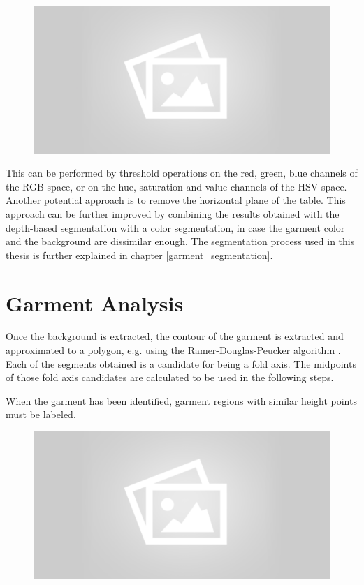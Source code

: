 \begin{figure}[thpb]
    \centering
    \includegraphics[width=0.8
    \textwidth]{figures/placeholder2.png}
    \caption{}
    \label{fig:generic_garment_segmentation}
\end{figure}

This can be performed by threshold operations on the red, green, blue channels of the RGB space, or on the hue, saturation and value channels of the HSV space. Another potential approach is to remove the horizontal plane of the table. This approach can be further improved by combining the results obtained with the depth-based segmentation with a color segmentation, in case the garment color and the background are dissimilar enough.
The segmentation process used in this thesis is further explained in chapter \ref{garment_segmentation}.

\section{Garment Analysis}
Once the background is extracted, the contour of the garment is extracted and approximated to a polygon, e.g. using the Ramer-Douglas-Peucker algorithm . Each of the segments obtained is a candidate for being a fold axis. The midpoints of those fold axis candidates are calculated to be used in the following steps.

When the garment has been identified, garment regions with similar height points must be labeled. 

\begin{figure}[thpb]
    \centering
    \includegraphics[width=0.8
    \textwidth]{figures/placeholder2.png}
    \caption{}
    \label{fig:generic_superpixels}
\end{figure}

